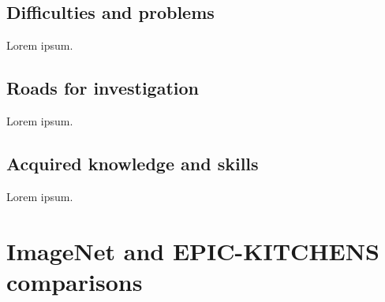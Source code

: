 \documentclass[12pt, a4paper]{report}
\begin{document}
		\section{Difficulties and problems}
			Lorem ipsum.
		\section{Roads for investigation}
			Lorem ipsum.
		\section{Acquired knowledge and skills}
			Lorem ipsum.
	
	
	\appendix
	\chapter{ImageNet and EPIC-KITCHENS comparisons}\label{appendix_a}
\end{document}
